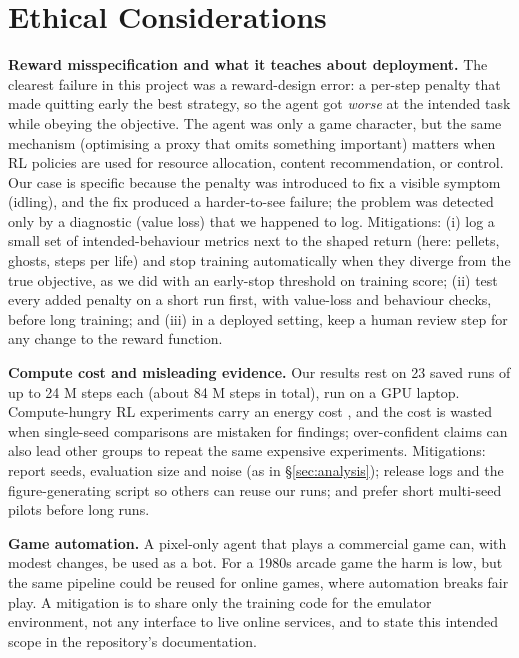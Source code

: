 \documentclass[11pt]{article}
\begin{document}
\section*{Ethical Considerations}
\label{sec:ethics}
\textbf{Reward misspecification and what it teaches about deployment.} The clearest failure in this project was a reward-design error: a per-step penalty that made quitting early the best strategy, so the agent got \emph{worse} at the intended task while obeying the objective. The agent was only a game character, but the same mechanism (optimising a proxy that omits something important) matters when RL policies are used for resource allocation, content recommendation, or control. Our case is specific because the penalty was introduced to fix a visible symptom (idling), and the fix produced a harder-to-see failure; the problem was detected only by a diagnostic (value loss) that we happened to log. Mitigations: (i) log a small set of intended-behaviour metrics next to the shaped return (here: pellets, ghosts, steps per life) and stop training automatically when they diverge from the true objective, as we did with an early-stop threshold on training score; (ii) test every added penalty on a short run first, with value-loss and behaviour checks, before long training; and (iii) in a deployed setting, keep a human review step for any change to the reward function.

\textbf{Compute cost and misleading evidence.} Our results rest on 23 saved runs of up to 24 M steps each (about 84 M steps in total), run on a GPU laptop. Compute-hungry RL experiments carry an energy cost \citep{strubell2019energy}, and the cost is wasted when single-seed comparisons are mistaken for findings; over-confident claims can also lead other groups to repeat the same expensive experiments. Mitigations: report seeds, evaluation size and noise (as in \S\ref{sec:analysis}); release logs and the figure-generating script so others can reuse our runs; and prefer short multi-seed pilots before long runs.

\textbf{Game automation.} A pixel-only agent that plays a commercial game can, with modest changes, be used as a bot. For a 1980s arcade game the harm is low, but the same pipeline could be reused for online games, where automation breaks fair play. A mitigation is to share only the training code for the emulator environment, not any interface to live online services, and to state this intended scope in the repository's documentation.



\end{document}
